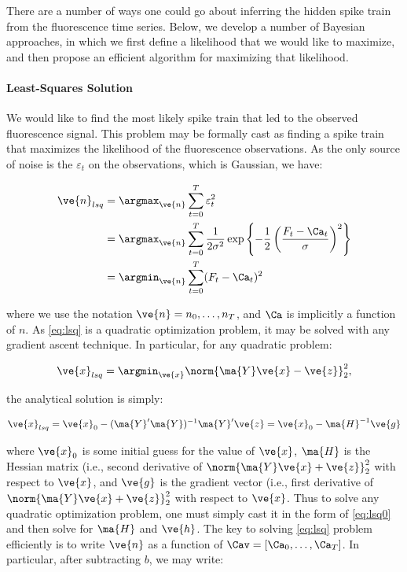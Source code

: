 There are a number of ways one could go about inferring the hidden spike train from the fluorescence time series.  Below, we develop a number of Bayesian approaches, in which we first define a likelihood that we would like to maximize, and then propose an efficient algorithm for maximizing that likelihood.

\paragraph{Least-Squares Solution}

We would like to find the most likely spike train that led to the observed fluorescence signal. This problem may be formally cast as finding a spike train that maximizes the likelihood of the fluorescence observations.  As the only source of noise is the $\varepsilon_t$ on the observations, which is Gaussian, we have: 

\begin{align} \label{eq:lsq}
\ve{n}_{lsq} &= \argmax_{\ve{n}} \sum_{t=0}^T \varepsilon_t^2\\
&= \argmax_{\ve{n}} \sum_{t=0}^T \frac{1}{2\sigma^2}\exp\left\{-\frac{1}{2}\left(\frac{F_t-\Ca_t}{\sigma}\right)^2\right\}\\
&= \argmin_{\ve{n}} \sum_{t=0}^T (F_t - \Ca_t)^2
\end{align}

\noindent where we use the notation $\ve{n}=n_0,\ldots, n_T$, and $\Ca$ is implicitly a function of $n$.  As \eqref{eq:lsq} is a quadratic optimization problem, it may be solved with any gradient ascent technique.  In particular, for any quadratic problem:

\begin{align} \label{eq:lsq0}
\ve{x}_{lsq} = \argmin_{\ve{x}} \norm{\ma{Y} \ve{x} - \ve{z}}_2^2,
\end{align}

\noindent the analytical solution is simply:

\begin{align}
\ve{x}_{lsq} = \ve{x}_0 - (\ma{Y}'\ma{Y})^{-1} \ma{Y}'\ve{z} 
= \ve{x}_0-\ma{H}^{-1}\ve{g}
\end{align}

\noindent where $\ve{x}_0$ is some initial guess for the value of $\ve{x}$, $\ma{H}$ is the Hessian matrix (i.e., second derivative of $\norm{\ma{Y} \ve{x} + \ve{z}}_2^2$ with respect to $\ve{x}$, and $\ve{g}$ is the gradient vector (i.e., first  derivative of $\norm{\ma{Y} \ve{x} + \ve{z}}_2^2$ with respect to $\ve{x}$. Thus to solve any quadratic optimization problem, one must simply cast it in the form of \eqref{eq:lsq0} and then solve for $\ma{H}$ and $\ve{h}$. The key to solving \eqref{eq:lsq} problem efficiently is to write $\ve{n}$ as a function of $\Cav=[\Ca_0,\ldots,\Ca_T]$. In particular, after subtracting $b$, we may write:

